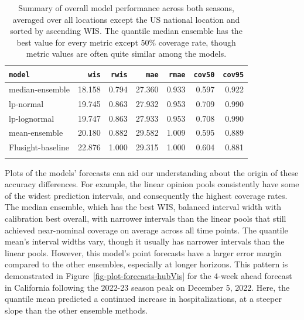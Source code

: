 \documentclass[
  article,
  shortnames,
  notitle]{jss}
\begin{document}
\begin{longtable}[]{@{}lrrrrrr@{}}

\toprule\noalign{}
\texttt{model} & \texttt{wis} & \texttt{rwis} & \texttt{mae} &
\texttt{rmae} & \texttt{cov50} & \texttt{cov95} \\
\midrule\noalign{}
\endhead
\bottomrule\noalign{}
\endlastfoot
median-ensemble & 18.158 & 0.794 & 27.360 & 0.933 & 0.597 & 0.922 \\
lp-normal & 19.745 & 0.863 & 27.932 & 0.953 & 0.709 & 0.990 \\
lp-lognormal & 19.747 & 0.863 & 27.933 & 0.953 & 0.708 & 0.990 \\
mean-ensemble & 20.180 & 0.882 & 29.582 & 1.009 & 0.595 & 0.889 \\
Flusight-baseline & 22.876 & 1.000 & 29.315 & 1.000 & 0.604 & 0.881 \\


\caption{\label{tbl-overall-evaluation}Summary of overall model
performance across both seasons, averaged over all locations except the
US national location and sorted by ascending WIS. The quantile median
ensemble has the best value for every metric except 50\% coverage rate,
though metric values are often quite similar among the models.}

\tabularnewline
\end{longtable}

Plots of the models' forecasts can aid our understanding about the
origin of these accuracy differences. For example, the linear opinion
pools consistently have some of the widest prediction intervals, and
consequently the highest coverage rates. The median ensemble, which has
the best WIS, balanced interval width with calibration best overall,
with narrower intervals than the linear pools that still achieved
near-nominal coverage on average across all time points. The quantile
mean's interval widths vary, though it usually has narrower intervals
than the linear pools. However, this model's point forecasts have a
larger error margin compared to the other ensembles, especially at
longer horizons. This pattern is demonstrated in
Figure~\ref{fig-plot-forecasts-hubVis} for the 4-week ahead forecast in
California following the 2022-23 season peak on December 5, 2022. Here,
the quantile mean predicted a continued increase in hospitalizations, at
a steeper slope than the other ensemble methods.
\end{document}
